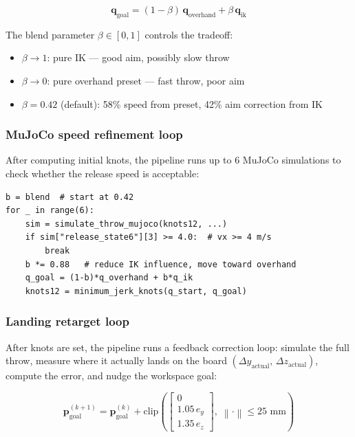 \documentclass[11pt,letterpaper]{article}
\newcommand{\bq}{\bm{q}}
\newcommand{\norm}[1]{\left\lVert#1\right\rVert}
\begin{document}
\begin{equation}
  \bq_{\text{goal}} = (1 - \beta)\,\bq_{\text{overhand}} + \beta\,\bq_{\text{ik}}
  \label{eq:blend}
\end{equation}

The blend parameter $\beta \in [0, 1]$ controls the tradeoff:
\begin{itemize}[nosep]
  \item $\beta \to 1$: pure IK — good aim, possibly slow throw
  \item $\beta \to 0$: pure overhand preset — fast throw, poor aim
  \item $\beta = 0.42$ (default): 58\% speed from preset, 42\% aim correction from IK
\end{itemize}

\subsubsection{MuJoCo speed refinement loop}
After computing initial knots, the pipeline runs up to 6 MuJoCo simulations to check whether the release speed is acceptable:

\begin{lstlisting}
b = blend  # start at 0.42
for _ in range(6):
    sim = simulate_throw_mujoco(knots12, ...)
    if sim["release_state6"][3] >= 4.0:  # vx >= 4 m/s
        break
    b *= 0.88   # reduce IK influence, move toward overhand
    q_goal = (1-b)*q_overhand + b*q_ik
    knots12 = minimum_jerk_knots(q_start, q_goal)
\end{lstlisting}

\subsubsection{Landing retarget loop}
After knots are set, the pipeline runs a feedback correction loop: simulate the full throw, measure where it actually lands on the board $(\Delta y_{\text{actual}},\, \Delta z_{\text{actual}})$, compute the error, and nudge the workspace goal:

\begin{equation}
  \bm{p}_{\text{goal}}^{(k+1)} = \bm{p}_{\text{goal}}^{(k)} + \text{clip}\!\left(\begin{bmatrix}0 \\ 1.05\,e_y \\ 1.35\,e_z\end{bmatrix},\; \norm{\cdot} \leq 25\text{ mm}\right)
  \label{eq:retarget}
\end{equation}
\end{document}
